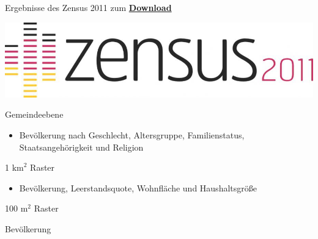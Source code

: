 \documentclass[ignorenonframetext,]{beamer}
\providecommand{\tightlist}{%
  \setlength{\itemsep}{0pt}\setlength{\parskip}{0pt}}
\begin{document}
\begin{frame}{Ergebnisse des Zensus 2011 zum
\href{https://www.zensus2011.de/SharedDocs/Aktuelles/Ergebnisse/DemografischeGrunddaten.html?nn=3065474}{\textbf{Download}}}

\includegraphics{figure/zensus2011_logo.jpg}

\begin{block}{Gemeindeebene}

\begin{itemize}
\tightlist
\item
  Bevölkerung nach Geschlecht, Altersgruppe, Familienstatus,
  Staatsangehörigkeit und Religion
\end{itemize}

\end{block}

\begin{block}{1 \(\text{km}^2\) Raster}

\begin{itemize}
\tightlist
\item
  Bevölkerung, Leerstandsquote, Wohnfläche und Haushaltsgröße
\end{itemize}

\end{block}

\begin{block}{100 \(\text{m}^2\) Raster}

Bevölkerung

\end{block}

\end{frame}
\end{document}
